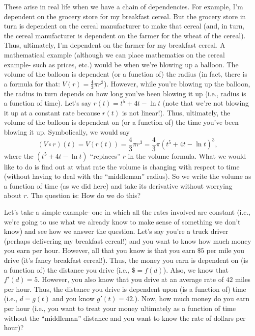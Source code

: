 \documentclass{ximera}
\begin{document}
These arise in real life when we have a chain of dependencies.  For example, I'm dependent on the grocery store for my breakfast cereal.  But the grocery store in turn is dependent on the cereal manufacturer to make that cereal (and, in turn, the cereal manufacturer is dependent on the farmer for the wheat of the cereal).  Thus, ultimately, I'm dependent on the farmer for my breakfast cereal.  A mathematical example (although we can place mathematics on the cereal example- such as prices, etc.) would be when we're blowing up a balloon.  The volume of the balloon is dependent (or a function of) the radius (in fact, there is a formula for that:   $V(r) = \frac{4}{3}\pi r^3$).  However, while you're blowing up the balloon, the radius in turn depends on how long you've been blowing it up (i.e., radius is a function of time). Let's say $r(t) = t^5+4t-\ln t$ (note that we're not blowing it up at a constant rate because $r(t)$ is not linear!).  Thus, ultimately, the volume of the balloon is dependent on (or a function of) the time you've been blowing it up.  Symbolically, we would say  
\[
(V \circ r)(t) = V(r(t)) = \frac{4}{3}\pi r^3 = \frac{4}{3}\pi (t^5+4t-\ln t)^3,
\] 
where the $(t^5+4t-\ln t)$ ``replaces'' $r$ in the volume formula.  What we would like to do is find out at what rate the volume is changing with respect to time (without having to deal with the ``middleman'' radius).  So we write the volume as a function of time (as we did here) and take its derivative without worrying about $r$.  The question is:  How do we do this?

Let's take a simple example- one in which all the rates involved are constant (i.e., we're going to use what we already know to make sense of something we don't know) and see how we answer the question.  Let's say you're a truck driver (perhaps delivering my breakfast cereal!) and you want to know how much money you earn per hour.  However, all that you know is that you earn $\$5$ per mile you drive (it's fancy breakfast cereal!).  Thus, the money you earn is dependent on (is a function of) the distance you drive (i.e., $\$=f(d)$).  Also, we know that $f'(d) = 5$.  However, you also know that you drive at an average rate of $42$ miles per hour.  Thus, the distance you drive is dependent upon (is a function of) time (i.e., $d=g(t)$ and you know  $g'(t) = 42$.).  Now, how much money do you earn per hour (i.e., you want to treat your money ultimately as a function of time without the ``middleman'' distance and you want to know the rate of dollars per hour)?
\end{document}
